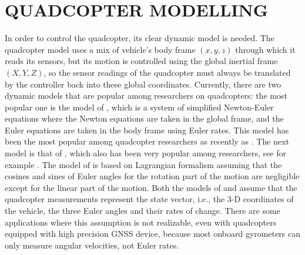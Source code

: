 \documentclass[twocolumn,10pt]{asme2e}
\begin{document}
\section*{QUADCOPTER MODELLING}
In order to control the quadcopter, its clear dynamic model is needed. The quadcopter model uses a mix of vehicle's body frame $(x,y,z) $ through which it reads its sensors, but its motion is controlled using the global inertial frame $(X,Y,Z)$, so the sensor readings of the quadcopter must always be translated by the controller back into these global coordinates. Currently, there are two dynamic models that are popular among researchers on quadcopters: the most popular one is the  model of \cite{1013341}, which is a system of simplified Newton-Euler equations where the Newton equations are taken in the global frame, and the Euler equations are taken in the body frame using Euler rates. This model has been the most popular among quadcopter researchers as recently as \cite{lee2009feedback,mu2019learning,castillo2019disturbance}. The next model is that of \cite{bouabdallah2007design}, which also has been very popular among researchers, see for example \cite{mellinger2012trajectory,alexis2011switching,leishman2014quadrotors}. The model of  \cite{bouabdallah2007design} is based on Lagrangian formalism assuming that the cosines and sines of Euler angles for the rotation part of the motion are negligible except for the linear part of the motion. Both the models of \cite{1013341} and \cite{bouabdallah2007design} assume that the quadcopter measurements represent the state vector, i.e., the 3-D coordinates of the vehicle, the three Euler angles and their rates of change. There are some applications where this assumption is not realizable, even with quadcopters equipped with high precision GNSS device, because most onboard gyrometers can only measure angular velocities, not Euler rates.
\end{document}
